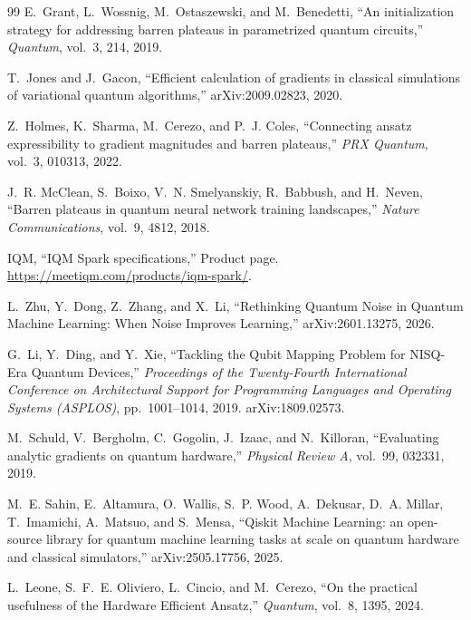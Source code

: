 \documentclass[11pt]{article}
\begin{document}
\begin{thebibliography}{99}
E.~Grant, L.~Wossnig, M.~Ostaszewski, and M.~Benedetti,
\newblock ``An initialization strategy for addressing barren plateaus in parametrized quantum circuits,''
\newblock \emph{Quantum}, vol.~3, 214, 2019.

T.~Jones and J.~Gacon,
\newblock ``Efficient calculation of gradients in classical simulations of variational quantum algorithms,''
\newblock arXiv:2009.02823, 2020.

Z.~Holmes, K.~Sharma, M.~Cerezo, and P.~J. Coles,
\newblock ``Connecting ansatz expressibility to gradient magnitudes and barren plateaus,''
\newblock \emph{PRX Quantum}, vol.~3, 010313, 2022.

J.~R. McClean, S.~Boixo, V.~N. Smelyanskiy, R.~Babbush, and H.~Neven,
\newblock ``Barren plateaus in quantum neural network training landscapes,''
\newblock \emph{Nature Communications}, vol.~9, 4812, 2018.

IQM,
\newblock ``IQM Spark specifications,''
\newblock Product page.
\newblock \url{https://meetiqm.com/products/iqm-spark/}.

L.~Zhu, Y.~Dong, Z.~Zhang, and X.~Li,
\newblock ``Rethinking Quantum Noise in Quantum Machine Learning: When Noise Improves Learning,''
\newblock arXiv:2601.13275, 2026.

G.~Li, Y.~Ding, and Y.~Xie,
\newblock ``Tackling the Qubit Mapping Problem for NISQ-Era Quantum Devices,''
\newblock \emph{Proceedings of the Twenty-Fourth International Conference on Architectural Support for Programming Languages and Operating Systems (ASPLOS)}, pp.~1001--1014, 2019.
\newblock arXiv:1809.02573.

M.~Schuld, V.~Bergholm, C.~Gogolin, J.~Izaac, and N.~Killoran,
\newblock ``Evaluating analytic gradients on quantum hardware,''
\newblock \emph{Physical Review A}, vol.~99, 032331, 2019.

M.~E. Sahin, E.~Altamura, O.~Wallis, S.~P. Wood, A.~Dekusar, D.~A. Millar, T.~Imamichi, A.~Matsuo, and S.~Mensa,
\newblock ``Qiskit Machine Learning: an open-source library for quantum machine learning tasks at scale on quantum hardware and classical simulators,''
\newblock arXiv:2505.17756, 2025.

L.~Leone, S.~F.~E. Oliviero, L.~Cincio, and M.~Cerezo,
\newblock ``On the practical usefulness of the Hardware Efficient Ansatz,''
\newblock \emph{Quantum}, vol.~8, 1395, 2024.

\end{thebibliography}
\end{document}
